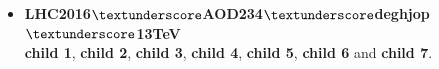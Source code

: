 \begin{itemize}
	\item \textbf{LHC2016$\textunderscore$AOD234$\textunderscore$deghjop$\textunderscore$13TeV} \\
	\textbf{child 1}, \textbf{child 2}, \textbf{child 3}, \textbf{child 4}, \textbf{child 5}, \textbf{child 6} and \textbf{child 7}.

	

\end{itemize}

